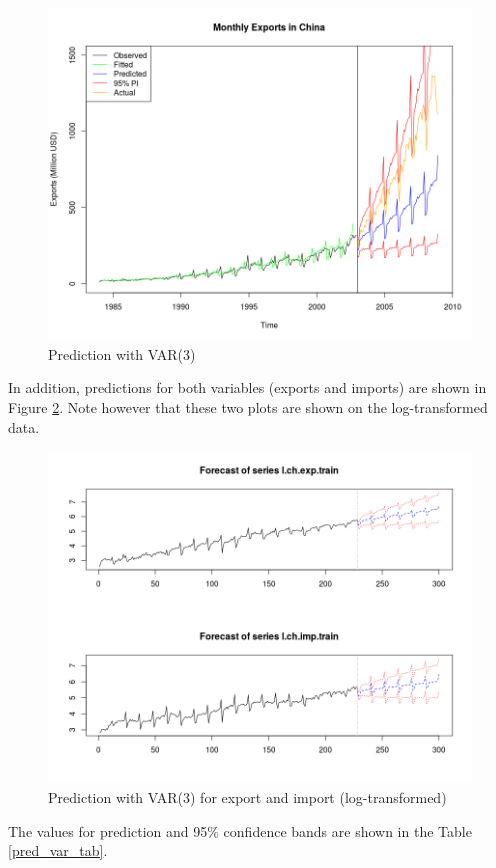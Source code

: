 \documentclass[]{article}
\begin{document}
\begin{figure}[!ht]
\centering
\includegraphics[width=.8\textwidth]{pred_var}
\caption{Prediction with VAR(3)}
\label{pred_var}
\end{figure}

In addition, predictions for both variables (exports and imports) are shown in Figure \ref{pred_var2}. Note however that these two plots are shown on the log-transformed data.

\begin{figure}[!ht]
\centering
\includegraphics[width=.8\textwidth]{pred_var2}
\caption{Prediction with VAR(3) for export and import (log-transformed)}
\label{pred_var2}
\end{figure}

The values for prediction and 95\% confidence bands are shown in the Table \ref{pred_var_tab}.
\end{document}
